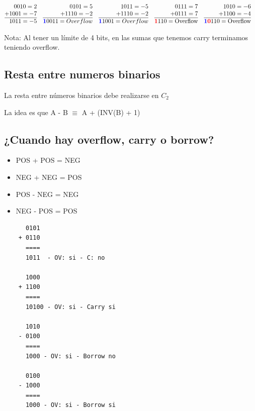 \documentclass[10pt,a4paper]{article}
\begin{document}
\begin{align*}
    &\begin{array}{@{} r@{}}
      0010 = 2 \\
    + 1001 = -7\\
    \hline
    \ 1011 = -5
    \end{array}
    &&
    \begin{array}{@{} r @{}}
       0101 = 5 \\
    + 1110 = -2 \\
    \hline
    \textcolor{blue}{\textbf{1}}0011 = Overflow
    \end{array}
    &&
    \begin{array}{@{} r @{}}
       1011 = -5 \\
    + 1110 = -2 \\
    \hline
    \textcolor{blue}{\textbf{1}}1001 = Overflow
    \end{array}
    &&
    \begin{array}{@{} r @{}}
       0111 = 7 \\
    + 0111 = 7\\
    \hline
    \textcolor{red}{\textbf{1}}110 = \text{Overflow}
    \end{array}
    &&
    \begin{array}{@{} r @{}}
       1010 = -6 \\
    + 1100 = -4 \\
    \hline
    \textcolor{blue}{\textbf{1}}\textcolor{red}{\textbf{0}}110 = \text{Overflow}
    \end{array}
    \end{align*}

Nota: Al tener un límite de 4 bits, en las sumas que tenemos carry terminamos teniendo overflow.
\subsection*{Resta entre numeros binarios}
La resta entre números binarios debe realizarse en \(C_{2}\)

La idea es que A - B \(\equiv\) A + (INV(B) + 1) 
\subsection*{¿Cuando hay overflow, carry o borrow?}
\begin{itemize}
    \item POS + POS = NEG
    \item NEG + NEG = POS
    \item POS - NEG = NEG
    \item NEG - POS = POS 
\end{itemize}
\begin{lstlisting}
      0101
    + 0110
      ====
      1011  - OV: si - C: no

      1000
    + 1100
      ====
      10100 - OV: si - Carry si

      1010
    - 0100
      ====
      1000 - OV: si - Borrow no

      0100
    - 1000
      ====
      1000 - OV: si - Borrow si
\end{lstlisting}
\end{document}
